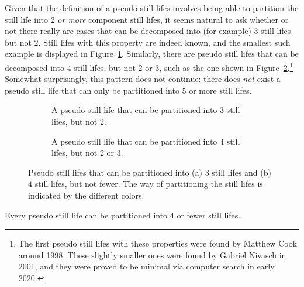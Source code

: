 Given that the definition of a pseudo still lifes involves being able to partition the still life into $2$ \emph{or more} component still lifes, it seems natural to ask whether or not there really are cases that can be decomposed into (for example) $3$ still lifes but not $2$. Still lifes with this property are indeed known, and the smallest such example is displayed in Figure~\ref{fig:triple_pseudo_still_life}. Similarly, there are pseudo still lifes that can be decomposed into $4$ still lifes, but not $2$ or $3$, such as the one shown in Figure~\ref{fig:quad_pseudo_still_life}.\footnote{The first pseudo still lifes with these properties were found by Matthew Cook around 1998. These slightly smaller ones were found by Gabriel Nivasch in 2001, and they were proved to be minimal via computer search in early 2020.} Somewhat surprisingly, this pattern does not continue: there does \emph{not} exist a pseudo still life that can only be partitioned into $5$ or more still lifes.

\begin{figure}[!htb]
	\begin{subfigure}{.48\textwidth}
		\centering
		\caption{A pseudo still life that can be partitioned into $3$ still lifes, but not $2$.}
		\label{fig:triple_pseudo_still_life}
	\end{subfigure} \quad %
	\begin{subfigure}{.48\textwidth}
		\centering
		\caption{A pseudo still life that can be partitioned into $4$ still lifes, but not $2$ or $3$.}
		\label{fig:quad_pseudo_still_life}
	\end{subfigure}
	\caption{Pseudo still lifes that can be partitioned into (a) $3$ still lifes  and (b) $4$ still lifes, but not fewer. The way of partitioning the still lifes is indicated by the different colors.}\label{fig:pseudo_still_life_decompose}
\end{figure}

\begin{theorem}\label{thm:pseudo_still_four}
	Every pseudo still life can be partitioned into $4$ or fewer still lifes.
\end{theorem}


